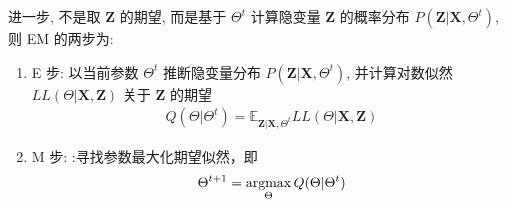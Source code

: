 进一步, 不是取 $\bm Z$ 的期望, 而是基于 $\Theta^t$ 计算隐变量 $\bm Z$ 的概率分布 $P(\bm Z| \bm X, \Theta^t)$, 则 EM  的两步为:
\begin{enumerate}
    \item E 步: 以当前参数 $\Theta^t$ 推断隐变量分布 $P(\bm Z| \bm X, \Theta^t)$, 并计算对数似然 $LL(\Theta|\bm X, \bm Z)$ 关于 $\bm Z$ 的期望
    \begin{align*}
        Q(\Theta|\Theta^t)=\mathbb{E}_{\bm Z|\bm X,\Theta^t}LL(\Theta|\bm X, \bm Z)
    \end{align*}
    \item M 步: :寻找参数最大化期望似然，即
    \begin{align*}
        \Theta^{t+1}=\operatorname*{argmax}_{\Theta}Q(\Theta|\Theta^t)
    \end{align*}
\end{enumerate}